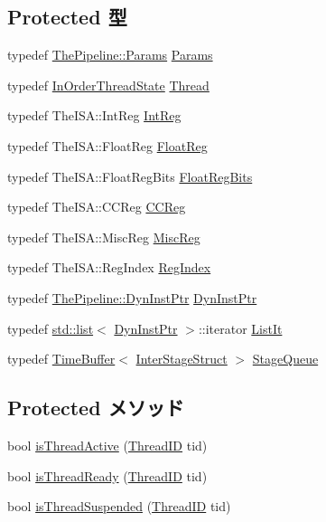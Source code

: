 \subsection*{Protected 型}
\begin{DoxyCompactItemize}
\item 
typedef \hyperlink{namespaceThePipeline_ab62ca16eeca26566ad2422b5df4943ce}{ThePipeline::Params} \hyperlink{classInOrderCPU_aa14874985381292db0aea05d1c8a122c}{Params}
\item 
typedef \hyperlink{classInOrderThreadState}{InOrderThreadState} \hyperlink{classInOrderCPU_a71082c68d1af09b939b47c729ab022e2}{Thread}
\item 
typedef TheISA::IntReg \hyperlink{classInOrderCPU_a1355cb78d031430d4d70eb5080267604}{IntReg}
\item 
typedef TheISA::FloatReg \hyperlink{classInOrderCPU_a75484259f1855aabc8d74c6eb1cfe186}{FloatReg}
\item 
typedef TheISA::FloatRegBits \hyperlink{classInOrderCPU_aab5eeae86499f9bfe15ef79360eccc64}{FloatRegBits}
\item 
typedef TheISA::CCReg \hyperlink{classInOrderCPU_a0c9de550a32808e6a25b54b6c791d5ab}{CCReg}
\item 
typedef TheISA::MiscReg \hyperlink{classInOrderCPU_aaf5f073a387db0556d1db4bcc45428bc}{MiscReg}
\item 
typedef TheISA::RegIndex \hyperlink{classInOrderCPU_a36d25e03e43fa3bb4c5482cbefe5e0fb}{RegIndex}
\item 
typedef \hyperlink{classRefCountingPtr}{ThePipeline::DynInstPtr} \hyperlink{classInOrderCPU_af9d0c8a46736ba6aa2d8bb94da1a5e73}{DynInstPtr}
\item 
typedef \hyperlink{classstd_1_1list}{std::list}$<$ \hyperlink{classRefCountingPtr}{DynInstPtr} $>$::iterator \hyperlink{classInOrderCPU_a184cb829e22cc656acb41864f68f51ea}{ListIt}
\item 
typedef \hyperlink{classTimeBuffer}{TimeBuffer}$<$ \hyperlink{structInterStageStruct}{InterStageStruct} $>$ \hyperlink{classInOrderCPU_a2dd1ce49bce6a9a8c83156a21ca638a0}{StageQueue}
\end{DoxyCompactItemize}
\subsection*{Protected メソッド}
\begin{DoxyCompactItemize}
\item 
bool \hyperlink{classInOrderCPU_aa5e706e11748c9fefd1c679848d0bd44}{isThreadActive} (\hyperlink{base_2types_8hh_ab39b1a4f9dad884694c7a74ed69e6a6b}{ThreadID} tid)
\item 
bool \hyperlink{classInOrderCPU_a410e64fde8cec544412d687a0904efb1}{isThreadReady} (\hyperlink{base_2types_8hh_ab39b1a4f9dad884694c7a74ed69e6a6b}{ThreadID} tid)
\item 
bool \hyperlink{classInOrderCPU_ac32ab10fb7199c0ae6000cb07a19b94f}{isThreadSuspended} (\hyperlink{base_2types_8hh_ab39b1a4f9dad884694c7a74ed69e6a6b}{ThreadID} tid)
\end{DoxyCompactItemize}
